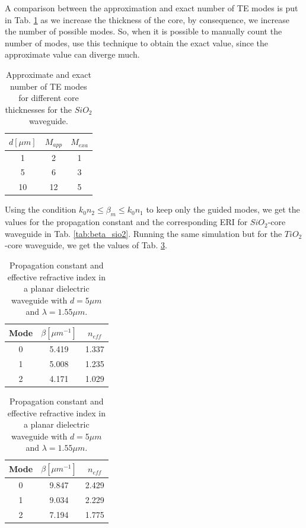 \documentclass[a4paper,12pt]{article}
\begin{document}
A comparison between the approximation and exact number of TE modes is put in Tab. \ref{tab:number_of_modes_comparison} as we increase the thickness of the core, by consequence, we increase the number of possible modes. So, when it is possible to manually count the number of modes, use this technique to obtain the exact value, since the approximate value can diverge much.

\begin{table}[H]
    \centering
    \begin{tabular}{ccc}
        \toprule
        $d [\mu m]$ & $M_{app}$ & $M_{exa}$ \\
        \midrule
        1 & 2 & 1 \\
        5 & 6 & 3 \\
        10 & 12 & 5 \\
        \bottomrule
    \end{tabular}
    \caption{Approximate and exact number of TE modes for different core thicknesses for the $SiO_2$ waveguide.}
    \label{tab:number_of_modes_comparison}
\end{table}

Using the condition $k_0 n_2 \leq \beta_m \leq k_0 n_1$ to keep only the guided modes, we get the values for the propagation constant and the corresponding ERI for $SiO_2$-core waveguide in Tab. \ref{tab:beta_sio2}. Running the same simulation but for the $TiO_2$-core waveguide, we get the values of Tab. \ref{tab:beta_tio2}.

\begin{table}[H]
    \centering
    \begin{subtable}{0.45\textwidth}
        \centering
        \begin{tabular}{ccc}
            \toprule
            Mode & $\beta [\mu m^{-1}]$ & $n_{eff}$ \\
            \midrule
            0 & 5.419 & 1.337 \\
            1 & 5.008 & 1.235 \\
            2 & 4.171 & 1.029 \\
            \bottomrule
        \end{tabular}
        \caption{$SiO_2$.}
        \label{tab:beta_sio2}
    \end{subtable}
    \hfill
    \begin{subtable}{0.45\textwidth}
        \centering
        \begin{tabular}{ccc}
            \toprule
            Mode & $\beta [\mu m^{-1}]$ & $n_{eff}$ \\
            \midrule
            0 & 9.847 & 2.429 \\
            1 & 9.034 & 2.229 \\
            2 & 7.194 & 1.775 \\
            \bottomrule
        \end{tabular}
        \caption{$TiO_2$.}
        \label{tab:beta_tio2}
    \end{subtable}
    \caption{Propagation constant and effective refractive index in a planar dielectric waveguide with $d = 5 \mu m$ and $\lambda = 1.55 \mu m$.}
\end{table}
\end{document}
